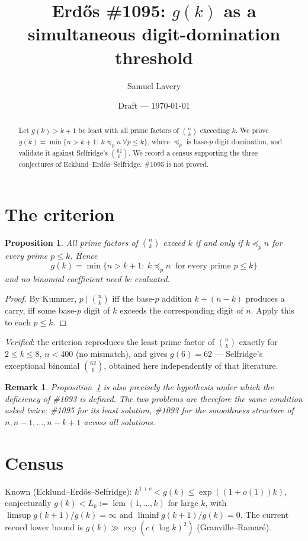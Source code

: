 \documentclass[11pt]{article}
\title{Erd\H{o}s \#1095: $g(k)$ as a simultaneous digit-domination threshold}
\author{Samuel Lavery}
\date{Draft --- \today}
\newtheorem{proposition}[theorem]{Proposition}
\newtheorem{remark}[theorem]{Remark}
\DeclareMathOperator{\lcmop}{lcm}
\begin{document}
\maketitle

\begin{abstract}
Let $g(k)>k+1$ be least with all prime factors of $\binom nk$ exceeding $k$.  We prove
$g(k)=\min\{n>k+1:\ k\preceq_p n\ \forall p\le k\}$, where $\preceq_p$ is base-$p$ digit
domination, and validate it against Selfridge's $\binom{62}{6}$.  We record a census
supporting the three conjectures of Ecklund--Erd\H{o}s--Selfridge.  \#1095 is not proved.
\end{abstract}

\section{The criterion}

\begin{proposition}\label{prop:crit}
All prime factors of $\binom nk$ exceed $k$ if and only if $k\preceq_p n$ for every prime
$p\le k$.  Hence
\[
  \boxed{\ g(k)=\min\{n>k+1:\ k\preceq_p n\ \text{ for every prime }p\le k\}\ }
\]
and no binomial coefficient need be evaluated.
\end{proposition}

\begin{proof}
By Kummer, $p\mid\binom nk$ iff the base-$p$ addition $k+(n-k)$ produces a carry, iff some
base-$p$ digit of $k$ exceeds the corresponding digit of $n$.  Apply this to each $p\le k$.
\end{proof}

\emph{Verified}: the criterion reproduces the least prime factor of $\binom nk$ exactly for
$2\le k\le8$, $n<400$ (no mismatch), and gives $g(6)=62$ --- Selfridge's exceptional binomial
$\binom{62}{6}$, obtained here independently of that literature.

\begin{remark}
Proposition~\ref{prop:crit} is also precisely the hypothesis under which the
\emph{deficiency} of \#1093 is defined.  The two problems are therefore the same condition
asked twice: \#1095 for its least solution, \#1093 for the smoothness structure of
$n,n-1,\dots,n-k+1$ across all solutions.
\end{remark}

\section{Census}
Known (Ecklund--Erd\H{o}s--Selfridge): $k^{1+c}<g(k)\le\exp((1+o(1))k)$, conjecturally
$g(k)<L_k:=\lcmop(1,\dots,k)$ for large $k$, with
$\limsup g(k{+}1)/g(k)=\infty$ and $\liminf g(k{+}1)/g(k)=0$.  The current record lower bound
is $g(k)\gg\exp(c(\log k)^{2})$ (Granville--Ramar\'e).
\end{document}

